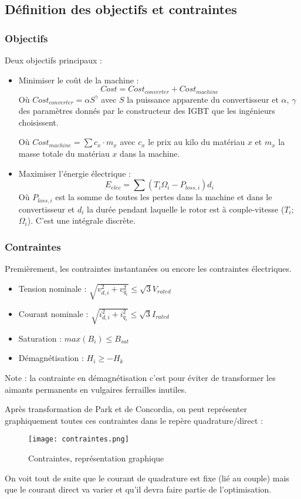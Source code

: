 \subsection{Définition des objectifs et contraintes}
\subsubsection{Objectifs}
Deux objectifs principaux :
\begin{itemize}
    \item Minimiser le coût de la machine :
    $$ Cost = Cost_{converter} + Cost_{machine}$$
    Où $Cost_{converter} = \alpha S^{\gamma}$ avec $S$ la puissance apparente du convertisseur et $\alpha$, $\gamma$ des paramètres donnés par le constructeur des IGBT que les ingénieurs choisissent.
    
    Où $Cost_{machine} = \sum c_x \cdot m_x$ avec $c_x$ le prix au kilo du matériau $x$ et $m_x$ la masse totale du matériau $x$ dans la machine. 
    \item Maximiser l'énergie électrique :
    $$ E_{elec} = \sum (T_i \Omega_i - P_{loss, i}) d_i$$
    Où $P_{loss,i}$ est la somme de toutes les pertes dans la machine et dans le convertisseur et $d_i$ la durée pendant laquelle le rotor est à couple-vitesse ($T_i$;$\Omega_i$). C'est une intégrale discrète.
\end{itemize}

\subsubsection{Contraintes}
Premièrement, les contraintes instantanées ou encore les contraintes électriques. 
\begin{itemize}
    \item Tension nominale : $\sqrt{v_{d,i}^2 + v_{q_i}^2} \le \sqrt{3}V_{rated}$
    \item Courant nominale : $\sqrt{i_{d,i}^2 + i_{q_i}^2} \le \sqrt{3}I_{rated}$
    \item Saturation : $max(B_i) \le B_{sat}$
    \item Démagnétisation : $H_i \ge -H_k$
\end{itemize}
Note : la contrainte en démagnétisation c'est pour éviter de transformer les aimants permanents en vulgaires ferrailles inutiles.

Après transformation de Park et de Concordia, on peut représenter graphiquement toutes ces contraintes dans le repère quadrature/direct :
\begin{figure}[H]
    \centering
    \texttt{[image: contraintes.png]}
    \caption{Contraintes, représentation graphique}
\end{figure}
On voit tout de suite que le courant de quadrature est fixe (lié au couple) mais que le courant direct va varier et qu'il devra faire partie de l'optimisation. 

